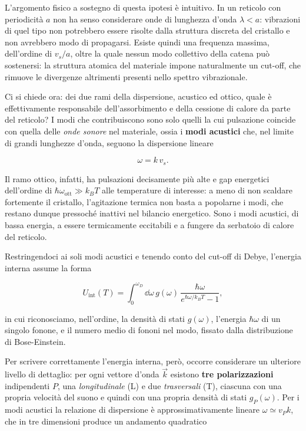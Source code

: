 L'argomento fisico a sostegno di questa ipotesi è intuitivo. In un reticolo con periodicità \( a \) non ha senso considerare onde di lunghezza d'onda \( \lambda < a \): vibrazioni di quel tipo non potrebbero essere risolte dalla struttura discreta del cristallo e non avrebbero modo di propagarsi. Esiste quindi una frequenza massima, dell'ordine di \( v_s / a \), oltre la quale nessun modo collettivo della catena può sostenersi: la struttura atomica del materiale impone naturalmente un cut-off, che rimuove le divergenze altrimenti presenti nello spettro vibrazionale.

Ci si chiede ora: dei due rami della dispersione, acustico ed ottico, quale è effettivamente responsabile dell'assorbimento e della cessione di calore da parte del reticolo? I modi che contribuiscono sono solo quelli la cui pulsazione coincide con quella delle \emph{onde sonore} nel materiale, ossia i \textbf{modi acustici} che, nel limite di grandi lunghezze d'onda, seguono la dispersione lineare

\begin{equation}
    \omega = k \, v_s.
\end{equation}

Il ramo ottico, infatti, ha pulsazioni decisamente più alte e gap energetici dell'ordine di \( \hbar \omega_{\text{ott}} \gg k_B T \) alle temperature di interesse: a meno di non scaldare fortemente il cristallo, l'agitazione termica non basta a popolarne i modi, che restano dunque pressoché inattivi nel bilancio energetico. Sono i modi acustici, di bassa energia, a essere termicamente eccitabili e a fungere da serbatoio di calore del reticolo.

Restringendoci ai soli modi acustici e tenendo conto del cut-off di Debye, l'energia interna assume la forma

\begin{equation}
    U_{\text{int}}(T) = \int_0^{\omega_D} \dd \omega \, g(\omega) \, \frac{\hbar \omega}{e^{\hbar \omega / k_B T} - 1},
\end{equation}

in cui riconosciamo, nell'ordine, la densità di stati \( g(\omega) \), l'energia \( \hbar \omega \) di un singolo fonone, e il numero medio di fononi nel modo, fissato dalla distribuzione di Bose-Einstein.

Per scrivere correttamente l'energia interna, però, occorre considerare un ulteriore livello di dettaglio: per ogni vettore d'onda \( \vec{k} \) esistono \textbf{tre polarizzazioni} indipendenti \( P \), una \emph{longitudinale} (L) e due \emph{trasversali} (T), ciascuna con una propria velocità del suono e quindi con una propria densità di stati \( g_P(\omega) \). Per i modi acustici la relazione di dispersione è approssimativamente lineare \( \omega \simeq v_P k \), che in tre dimensioni produce un andamento quadratico


